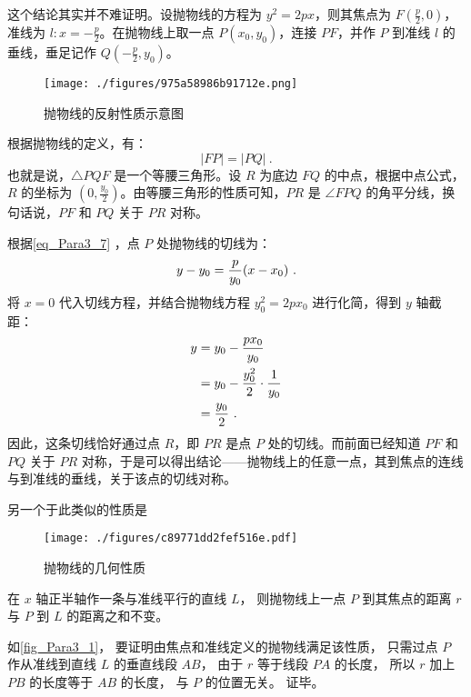 这个结论其实并不难证明。设抛物线的方程为 $y^2 = 2px$，则其焦点为 $\displaystyle F\left(\frac{p}{2}, 0\right)$，准线为 $\displaystyle l: x = -\frac{p}{2}$。在抛物线上取一点 $P(x_0, y_0)$，连接 $PF$，并作 $P$ 到准线 $l$ 的垂线，垂足记作 $Q\left( \displaystyle -\frac{p}{2}, y_0 \right)$。

\begin{figure}[ht]
\centering
\texttt{[image: ./figures/975a58986b91712e.png]}
\caption{抛物线的反射性质示意图} \label{fig_Para3_3}
\end{figure}

根据抛物线的定义，有：
\begin{equation}
|FP| = |PQ|~.
\end{equation}
也就是说，$\triangle PQF$ 是一个等腰三角形。设 $R$ 为底边 $FQ$ 的中点，根据中点公式，$R$ 的坐标为 $\displaystyle \left( 0, \frac{y_0}{2} \right)$。由等腰三角形的性质可知，$PR$ 是 $\angle FPQ$ 的角平分线，换句话说，$PF$ 和 $PQ$ 关于 $PR$ 对称。

根据\autoref{eq_Para3_7} ，点 $P$ 处抛物线的切线为：
\begin{equation}
y-y_0={p\over y_0}(x-x_0)~.
\end{equation}
将 $x = 0$ 代入切线方程，并结合抛物线方程 $y_0^2 = 2px_0$ 进行化简，得到 $y$ 轴截距：
\begin{equation}
\begin{split}
y&=y_0-{px_0\over y_0}\\
&=y_0-{y_0^2\over 2}\cdot{1\over y_0}\\
&={y_0\over 2}~.
\end{split}
\end{equation}
因此，这条切线恰好通过点 $R$，即 $PR$ 是点 $P$ 处的切线。而前面已经知道 $PF$ 和 $PQ$ 关于 $PR$ 对称，于是可以得出结论——抛物线上的任意一点，其到焦点的连线与到准线的垂线，关于该点的切线对称。

另一个于此类似的性质是
\begin{figure}[ht]
\centering
\texttt{[image: ./figures/c89771dd2fef516e.pdf]}
\caption{抛物线的几何性质} \label{fig_Para3_1}
\end{figure}

在 $x$ 轴正半轴作一条与准线平行的直线 $L$， 则抛物线上一点 $P$ 到其焦点的距离 $r$ 与 $P$ 到 $L$ 的距离之和不变。

如\autoref{fig_Para3_1}， 要证明由焦点和准线定义的抛物线满足该性质， 只需过点 $P$ 作从准线到直线 $L$ 的垂直线段 $AB$， 由于 $r$ 等于线段 $PA$ 的长度， 所以 $r$ 加上 $PB$ 的长度等于 $AB$ 的长度， 与 $P$ 的位置无关。 证毕。